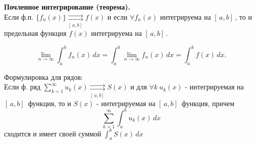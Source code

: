 \bigbreak
\textbf{Почленное интегрирование (теорема).} \\
Если ф.п. $\{f_n(x)\} \underset{[\,a,b]\, }{\rightrightarrows}f(x)$ и если $\forall f_n(x)$ интегрируема на $[\,a,b]\,$, то и предельная функция $f(x)$ интегрируема на $[\,a,b]\,$.

\begin{equation}
    \lim_{n \rightarrow \infty}{\int_{a}^{b} f_n(x) \,dx} =  \int_{a}^{b} \lim_{n \rightarrow \infty}{f_n(x)} \,dx = \int_{a}^{b} f(x) \,dx.
\end{equation}
\bigbreak

Формулировка для рядов: \\
Если ф. ряд $\sum_{k=1}^{\infty}u_k(x) \underset{[\,a,b]\,}{\rightrightarrows}S(x)$ и для $\forall k \ u_k(x)$ - интегрируемая на $[\,a,b]\,$ функция, то и $S(x)$ - интегрируемая на $[\,a,b]\,$ функция, причем
$$
    \sum_{k=1}^{\infty} \int_a^b u_k(x) \, dx
$$
сходится и имеет своей суммой $\int_a^b S(x) \, dx$

